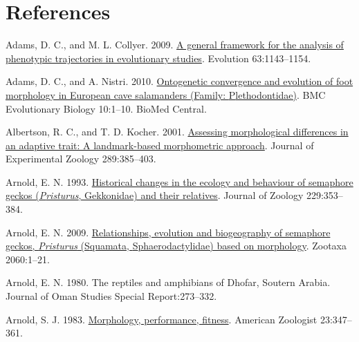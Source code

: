 \documentclass[
  11pt,
]{article}
\newlength{\cslhangindent}
\newlength{\cslentryspacingunit} %
\newenvironment{CSLReferences}[2] %
 {%
  \setlength{\parindent}{0pt}
  \ifodd #1
  \let\oldpar\par
  \def\par{\hangindent=\cslhangindent\oldpar}
  \fi
  \setlength{\parskip}{#2\cslentryspacingunit}
 }%
 {}
\begin{document}
\newpage

\hypertarget{references}{%
\section*{References}\label{references}}

\setlength{\parindent}{-0.25in} \setlength{\leftskip}{0.25in}
\setlength{\parskip}{8pt} \noindent

\hypertarget{refs}{}
\begin{CSLReferences}{1}{0}
\leavevmode{}%
Adams, D. C., and M. L. Collyer. 2009.
\href{https://doi.org/10.1111/j.1558-5646.2009.00649.x}{A general
framework for the analysis of phenotypic trajectories in evolutionary
studies}. Evolution 63:1143--1154.

\leavevmode{}%
Adams, D. C., and A. Nistri. 2010.
\href{https://doi.org/10.1186/1471-2148-10-216}{Ontogenetic convergence
and evolution of foot morphology in {E}uropean cave salamanders
({F}amily: {P}lethodontidae)}. BMC Evolutionary Biology 10:1--10. BioMed
Central.

\leavevmode{}%
Albertson, R. C., and T. D. Kocher. 2001.
\href{https://doi.org/10.1002/jez.1020}{Assessing morphological
differences in an adaptive trait: A landmark-based morphometric
approach}. Journal of Experimental Zoology 289:385--403.

\leavevmode{}%
Arnold, E. N. 1993.
\href{https://doi.org/10.1111/j.1469-7998.1993.tb02642.x}{Historical
changes in the ecology and behaviour of semaphore geckos
(\emph{{P}risturus}, {G}ekkonidae) and their relatives}. Journal of
Zoology 229:353--384.

\leavevmode{}%
Arnold, E. N. 2009.
\href{https://doi.org/10.11646/zootaxa.2060.1.1}{Relationships,
evolution and biogeography of semaphore geckos, \emph{{P}risturus}
({S}quamata, {S}phaerodactylidae) based on morphology}. Zootaxa
2060:1--21.

\leavevmode{}%
Arnold, E. N. 1980. The reptiles and amphibians of {D}hofar, {S}outern
{A}rabia. Journal of Oman Studies Special Report:273--332.

\leavevmode{}%
Arnold, S. J. 1983.
\href{https://doi.org/10.1093/icb/23.2.347}{Morphology, performance,
fitness}. American Zoologist 23:347--361.


\end{CSLReferences}
\end{document}

